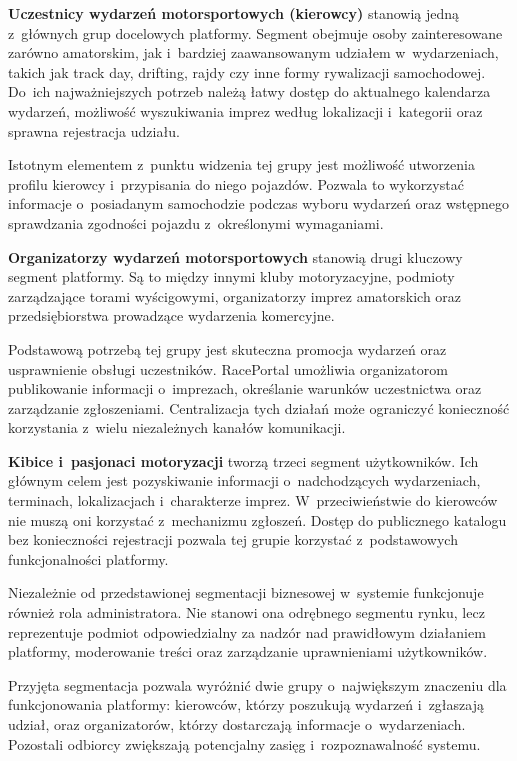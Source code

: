 \documentclass{sprz}
\begin{document}
\textbf{Uczestnicy wydarzeń motorsportowych (kierowcy)} stanowią jedną z~głównych grup docelowych platformy. Segment obejmuje osoby zainteresowane zarówno amatorskim, jak i~bardziej zaawansowanym udziałem w~wydarzeniach, takich jak track day, drifting, rajdy czy inne formy rywalizacji samochodowej. Do~ich najważniejszych potrzeb należą łatwy dostęp do aktualnego kalendarza wydarzeń, możliwość wyszukiwania imprez według lokalizacji i~kategorii oraz sprawna rejestracja udziału.

Istotnym elementem z~punktu widzenia tej grupy jest możliwość utworzenia profilu kierowcy i~przypisania do niego pojazdów. Pozwala to wykorzystać informacje o~posiadanym samochodzie podczas wyboru wydarzeń oraz wstępnego sprawdzania zgodności pojazdu z~określonymi wymaganiami.

\textbf{Organizatorzy wydarzeń motorsportowych} stanowią drugi kluczowy segment platformy. Są to między innymi kluby motoryzacyjne, podmioty zarządzające torami wyścigowymi, organizatorzy imprez amatorskich oraz przedsiębiorstwa prowadzące wydarzenia komercyjne.

Podstawową potrzebą tej grupy jest skuteczna promocja wydarzeń oraz usprawnienie obsługi uczestników. RacePortal umożliwia organizatorom publikowanie informacji o~imprezach, określanie warunków uczestnictwa oraz zarządzanie zgłoszeniami. Centralizacja tych działań może ograniczyć konieczność korzystania z~wielu niezależnych kanałów komunikacji.

\textbf{Kibice i~pasjonaci motoryzacji} tworzą trzeci segment użytkowników. Ich głównym celem jest pozyskiwanie informacji o~nadchodzących wydarzeniach, terminach, lokalizacjach i~charakterze imprez. W~przeciwieństwie do kierowców nie muszą oni korzystać z~mechanizmu zgłoszeń. Dostęp do publicznego katalogu bez konieczności rejestracji pozwala tej grupie korzystać z~podstawowych funkcjonalności platformy.

Niezależnie od przedstawionej segmentacji biznesowej w~systemie funkcjonuje również rola administratora. Nie stanowi ona odrębnego segmentu rynku, lecz reprezentuje podmiot odpowiedzialny za nadzór nad prawidłowym działaniem platformy, moderowanie treści oraz zarządzanie uprawnieniami użytkowników.

Przyjęta segmentacja pozwala wyróżnić dwie grupy o~największym znaczeniu dla funkcjonowania platformy: kierowców, którzy poszukują wydarzeń i~zgłaszają udział, oraz organizatorów, którzy dostarczają informacje o~wydarzeniach. Pozostali odbiorcy zwiększają potencjalny zasięg i~rozpoznawalność systemu.
\end{document}

